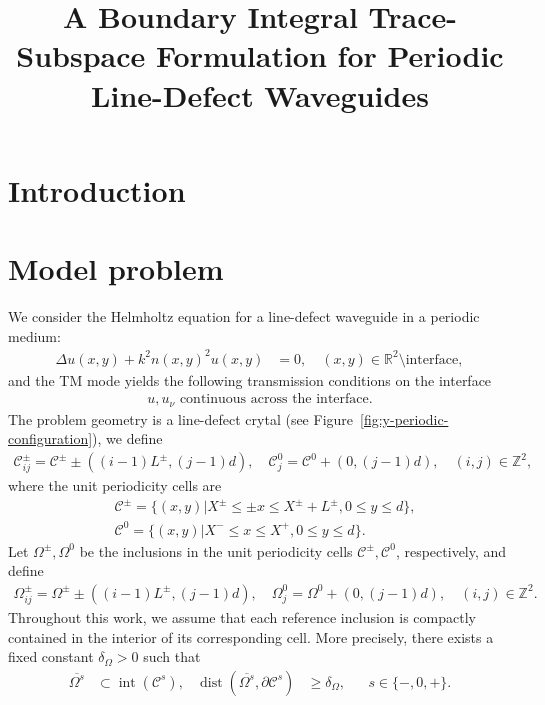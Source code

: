 \documentclass[11pt,fleqn]{article}
\title{A Boundary Integral Trace-Subspace Formulation for Periodic Line-Defect Waveguides}
\author{}
\date{}
\theoremstyle{definition}
\theoremstyle{remark}
\begin{document}
\maketitle

\section{Introduction}

\section{Model problem}
\label{sec:model-problem}
We consider the Helmholtz equation for a line-defect waveguide in a periodic medium: 
\begin{align}
 \Delta u(x, y) + k^2 n(x, y)^2 u(x, y) &= 0, \quad (x, y) \in \mathbb{R}^2 \setminus \text{interface}, \label{eq:helmholtz-equation}
\end{align}
and the TM mode yields the following transmission conditions on the interface \begin{align}
  u, u_\nu \text{ continuous across the interface.} \label{eq:transmission-conditions}
\end{align}
The problem geometry is a line-defect crytal (see Figure~\ref{fig:y-periodic-configuration}), we
define \begin{align*}
  \mathcal{C}^\pm_{ij} = \mathcal{C}^\pm \pm ((i-1)L^\pm, (j-1)d), \quad
  \mathcal{C}^0_j = \mathcal{C}^0 + (0, (j-1)d),\quad (i,j) \in \mathbb{Z}^2,
\end{align*}
where the unit periodicity cells are \begin{align*}
  &\mathcal{C}^\pm = \{ (x, y) | X^\pm \leq \pm x \leq X^\pm + L^\pm, 0 \leq y \leq d \},\\
  &\mathcal{C}^0 = \{ (x, y) | X^- \leq x \leq X^+, 0 \leq y \leq d \}.
\end{align*}
Let $\Omega^\pm, \Omega^0$ be the inclusions in the unit periodicity cells $\mathcal{C}^\pm, \mathcal{C}^0$, respectively, and define \begin{align*}
  \Omega^\pm_{ij} = \Omega^\pm \pm ((i-1)L^\pm, (j-1)d), \quad
  \Omega^0_j = \Omega^0 + (0, (j-1)d),\quad (i,j) \in \mathbb{Z}^2.
\end{align*}
Throughout this work, we assume that each reference inclusion is compactly
contained in the interior of its corresponding cell. More precisely, there
exists a fixed constant \(\delta_\Omega>0\) such that
\begin{align*}
  \overline{\Omega^s}&\subset\operatorname{int}(\mathcal C^s),
  &\operatorname{dist}\!\left(\overline{\Omega^s},\partial\mathcal C^s\right)
  &\geq\delta_\Omega,
  &&s\in\{-,0,+\}.
\end{align*}
\end{document}
